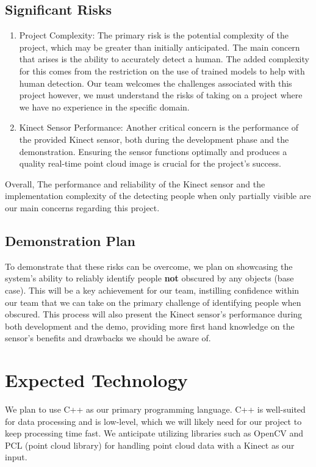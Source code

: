 \documentclass{article}
\begin{document}
\subsection*{Significant Risks}
\begin{enumerate}
\item Project Complexity: The primary risk is the potential complexity of the project, which may be greater than initially anticipated. The main concern that arises is the ability to accurately detect a human. 
The added complexity for this comes from the restriction on the use of trained models to help with human detection.
Our team welcomes the challenges associated with this project however, we must understand the risks of taking on a project where we have no experience in the specific domain.

\item Kinect Sensor Performance: Another critical concern is the performance of the provided Kinect sensor, both during the development phase and the demonstration. 
Ensuring the sensor functions optimally and produces a quality real-time point cloud image is crucial for the project's success.

\end{enumerate}

Overall, The performance and reliability of the Kinect sensor and the implementation complexity of the detecting people when only partially visible are our main concerns regarding this project.

\subsection*{Demonstration Plan}

To demonstrate that these risks can be overcome, we plan on showcasing the system's ability to reliably identify people \textbf{not} obscured by any objects (base case). 
This will be a key achievement for our team, instilling confidence within our team that we can take on the primary challenge of identifying people when obscured.
This process will also present the Kinect sensor's performance during both development and the demo, providing more first hand knowledge on the sensor's benefits and drawbacks we should be aware of.

\section{Expected Technology}

We plan to use C++ as our primary programming language. 
C++ is well-suited for data processing and is low-level, which we will likely need for our project to keep processing time fast.
We anticipate utilizing libraries such as OpenCV and PCL (point cloud library) for handling point cloud data with a Kinect as our input.\\
\end{document}
